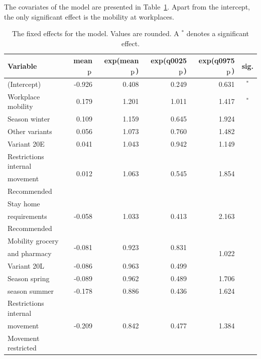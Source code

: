 The covariates of the model are presented in Table~\ref{fixed_norway_temporal}. Apart from the intercept, the only significant effect is the mobility at workplaces.
\begin{table}[H]
\caption{The fixed effects for the model. Values are rounded. A $^*$ denotes a significant effect. \label{fixed_norway_temporal}}
\begin{tabular}{l r r r r c}
\toprule
\textbf{Variable}	& \textbf{mean$_{\hbox{p}}$}	& \textbf{exp(mean$_{\hbox{p}}$)} & \textbf{exp(q0025$_{\hbox{p}}$)} & \textbf{exp(q0975$_{\hbox{p}}$)} & \textbf{sig.}\\
\midrule
(Intercept) & -0.926 & 0.408 & 0.249 & 0.631 & $^*$ \\
Workplace mobility & 0.179 & 1.201 & 1.011 & 1.417 & $^*$ \\
Season winter & 0.109 & 1.159 & 0.645 & 1.924 \\
Other variants & 0.056 & 1.073 & 0.760 & 1.482 \\
Variant 20E & 0.041 & 1.043 & 0.942 & 1.149 \\
Restrictions internal & \multirow{3}{*}{0.012} & \multirow{3}{*}{1.063} & \multirow{3}{*}{0.545}& \multirow{3}{*}{1.854}\\
movement \\
Recommended \\
Stay home & \multirow{3}{*}{-0.058} & \multirow{3}{*}{1.033} & \multirow{3}{*}{0.413}& \multirow{3}{*}{2.163}\\
requirements \\
Recommended \\
Mobility grocery & \multirow{2}{*}{-0.081} & \multirow{2}{*}{0.923} & \multirow{2}{*}{0.831}& \multirow{3}{*}{1.022}\\
and pharmacy \\
Variant 20L & -0.086 & 0.963& 0.499 & 1.684 \\
Season spring & -0.089 & 0.962 &0.489 & 1.706 \\
season summer & -0.178 & 0.886 & 0.436 & 1.624\\
Restrictions internal & \multirow{3}{*}{-0.209} & \multirow{3}{*}{0.842}& \multirow{3}{*}{0.477}& \multirow{3}{*}{1.384} \\
movement \\
Movement restricted \\
\bottomrule
\end{tabular}
\end{table}